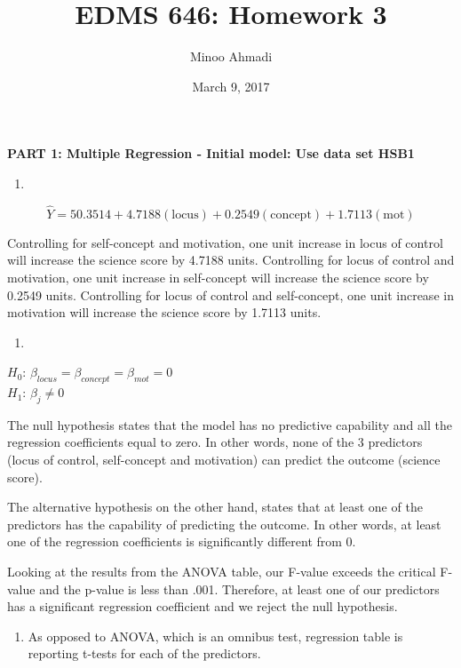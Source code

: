 \documentclass[]{article}
\title{EDMS 646: Homework 3}
\author{Minoo Ahmadi}
\date{March 9, 2017}
\providecommand{\tightlist}{%
  \setlength{\itemsep}{0pt}\setlength{\parskip}{0pt}}
\begin{document}
\maketitle

\begin{center}
\Large \textbf{PART 1: Multiple Regression - Initial model: Use data set HSB1}
\end{center}

\begin{enumerate}
\def\labelenumi{\arabic{enumi}.}
\item
\end{enumerate}

\[\hat{Y} = 50.3514 + 4.7188(\text{locus}) + 0.2549(\text{concept}) + 1.7113(\text{mot})\]

Controlling for self-concept and motivation, one unit increase in locus
of control will increase the science score by 4.7188 units. Controlling
for locus of control and motivation, one unit increase in self-concept
will increase the science score by 0.2549 units. Controlling for locus
of control and self-concept, one unit increase in motivation will
increase the science score by 1.7113 units.

\begin{enumerate}
\def\labelenumi{\arabic{enumi}.}
\setcounter{enumi}{1}
\item
\end{enumerate}

\(H_0\): \(\beta_{locus} = \beta_{concept} = \beta_{mot} = 0\)\\
\(H_1\): \(\beta_j \neq 0\)

The null hypothesis states that the model has no predictive capability
and all the regression coefficients equal to zero. In other words, none
of the 3 predictors (locus of control, self-concept and motivation) can
predict the outcome (science score).

The alternative hypothesis on the other hand, states that at least one
of the predictors has the capability of predicting the outcome. In other
words, at least one of the regression coefficients is significantly
different from 0.

Looking at the results from the ANOVA table, our F-value exceeds the
critical F-value and the p-value is less than .001. Therefore, at least
one of our predictors has a significant regression coefficient and we
reject the null hypothesis.

\begin{enumerate}
\def\labelenumi{\arabic{enumi}.}
\setcounter{enumi}{2}
\tightlist
\item
  As opposed to ANOVA, which is an omnibus test, regression table is
  reporting t-tests for each of the predictors.
\end{enumerate}
\end{document}
